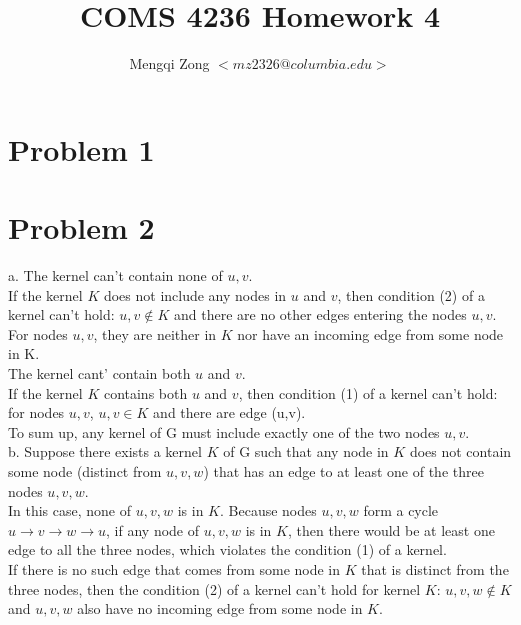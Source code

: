 \documentclass[12pt]{article}
\title{COMS 4236 Homework 4}
\author{Mengqi Zong $<mz2326@columbia.edu>$}
\begin{document}
\maketitle

\setlength{\parindent}{0in}

\section*{Problem 1}


\section*{Problem 2}

a. The kernel can't contain none of $u, v$. \\

If the kernel $K$ does not include any nodes in $u$ and $v$, then condition (2) of a kernel can't hold: $u,v \notin K$ and there are no other edges entering the nodes $u, v$. For nodes $u, v$, they are neither in $K$ nor have an incoming edge from some node in K. \\

The kernel cant' contain both $u$ and $v$. \\

If the kernel $K$ contains both $u$ and $v$, then condition (1) of a kernel can't hold: for nodes $u, v$, $u,v \in K$ and there are edge (u,v). \\

To sum up, any kernel of G must include exactly one of the two nodes $u,v$. \\

b. Suppose there exists a kernel $K$ of G such that any node in $K$ does not contain some node (distinct from $u, v, w$) that has an edge to at least one of the three nodes $u, v, w$. \\

In this case, none of $u, v, w$ is in $K$. Because nodes $u, v, w$ form a cycle $u \to v \to w \to u$, if any node of $u, v, w$ is in $K$, then there would be at least one edge to all the three nodes, which violates the condition (1) of a kernel. \\

If there is no such edge that comes from some node in $K$ that is distinct from the three nodes, then the condition (2) of a kernel can't hold for kernel $K$: $u, v, w \notin K$ and $u, v, w$ also have no incoming edge from some node in $K$. 
\end{document}

